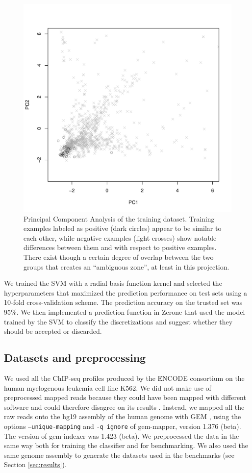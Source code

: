 \documentclass{bioinfo}
\begin{document}
\begin{methods}
\begin{figure}[!tpb]
\centerline{\includegraphics[scale=0.5]{pca.pdf}}
\caption{Principal Component Analysis of the training dataset.
Training examples labeled as positive (dark circles) appear to be similar to
each other, while negative examples (light crosses) show notable differences
between them and with respect to positive examples. There exist though a
certain degree of overlap between the two groups that creates an
``ambiguous zone'', at least in this projection.
}\label{fig:pca}
\end{figure}

We trained the SVM with a radial basis function kernel and
selected the hyperparameters that maximized the prediction
performance on test sets using a 10-fold cross-validation scheme.
The prediction accuracy on the trusted set was 95\%.
We then implemented a prediction function in Zerone that used the
model trained by the SVM to classify the discretizations and
suggest whether they should be accepted or discarded.

\subsection{Datasets and preprocessing}
We used all the ChIP-seq profiles produced by the ENCODE consortium
on the human myelogenous leukemia cell line K562. We did not make use
of preprocessed mapped reads because they could have been mapped with
different software and could therefore disagree on its results
\citep{pmid21059603}. Instead, we mapped all the raw reads onto the
hg19 assembly of the human genome with GEM \citep{pmid23103880}, using
the options \texttt{--unique-mapping} and \texttt{-q ignore} of gem-mapper,
version 1.376 (beta). The version of gem-indexer was 1.423 (beta). We
preprocessed the data in the same way both for training the classifier
and for benchmarking. We also used the same genome assembly to generate
the datasets used in the benchmarks (see Section \ref{sec:results}).


\end{methods}
\end{document}
